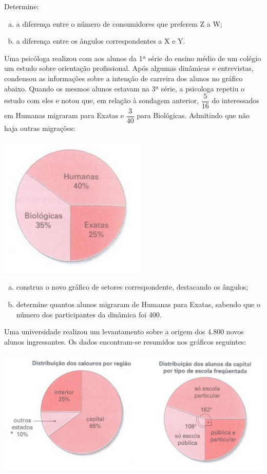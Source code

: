 	Determine:
	\begin{enumerate}[a)]
		\item a diferença entre o número de consumidores que preferem Z a W;
		\item a diferença entre os ângulos correspondentes a X e Y.
	\end{enumerate}
	
	\item Uma psicóloga realizou com aos alunos da 1ª série do ensino médio de um colégio um estudo sobre orientação profissional. Após algumas dinâmicas e entrevistas, condensou as informações sobre a intenção de carreira dos alunos no gráfico abaixo. Quando os mesmos alunos estavam na 3ª série, a psicologa repetiu o estudo com eles e notou que, em relação à sondagem anterior, $\dfrac{5}{16}$ do interessados em Humanas migraram para Exatas e $\dfrac{3}{40}$ para Biológicas. Admitindo que não haja outras migrações:
	
	\begin{center}
		\includegraphics[scale=0.7]{figuras/fig113.png}
	\end{center}	
	
	\begin{enumerate}[a)]
		\item construa o novo gráfico de setores correspondente, destacando os ângulos;
		\item determine quantos alunos migraram de Humanas para Exatas, sabendo que o número dos participantes da dinâmica foi 400.
	\end{enumerate}
	
	\item Uma universidade realizou um levantamento sobre a origem dos 4.800 novos alunos ingressantes. Os dados encontram-se resumidos nos gráficos seguintes:
	
	\includegraphics[scale=0.7]{figuras/fig114.png}
	
